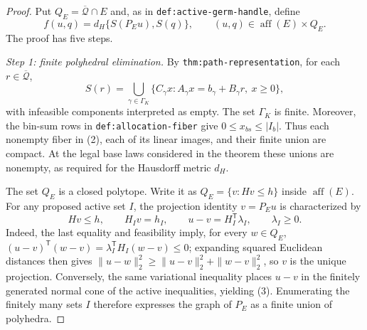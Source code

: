 \documentclass{article}
\begin{document}
\begin{proof}
Put \(Q_E=\overline{\mathcal Q}\cap E\) and, as in \texttt{def:active-germ-handle}, define
\[
 f(u,q)=d_H\{S(P_Eu),S(q)\},
 \qquad (u,q)\in\operatorname{aff}(E)\times Q_E.
\tag{1}
\]
The proof has five steps.

\emph{Step 1: finite polyhedral elimination.}
By \texttt{thm:path-representation}, for each \(r\in\overline{\mathcal Q}\),
\[
 S(r)=\bigcup_{\gamma\in\Gamma_K}
 \{C_\gamma x:A_\gamma x=b_\gamma+B_\gamma r,\ x\geq0\},
\tag{2}
\]
with infeasible components interpreted as empty.  The set \(\Gamma_K\) is finite.  Moreover, the bin-sum rows in \texttt{def:allocation-fiber} give \(0\leq x_{bs}\leq |I_b|\).  Thus each nonempty fiber in (2), each of its linear images, and their finite union are compact.  At the legal base laws considered in the theorem these unions are nonempty, as required for the Hausdorff metric \(d_H\).

The set \(Q_E\) is a closed polytope.  Write it as \(Q_E=\{v:Hv\leq h\}\) inside \(\operatorname{aff}(E)\).  For any proposed active set \(I\), the projection identity \(v=P_Eu\) is characterized by
\[
 Hv\leq h,\qquad H_Iv=h_I,\qquad
 u-v=H_I^{\mathsf T}\lambda_I,\qquad \lambda_I\geq0.
\tag{3}
\]
Indeed, the last equality and feasibility imply, for every \(w\in Q_E\),
\((u-v)^{\mathsf T}(w-v)=\lambda_I^{\mathsf T}H_I(w-v)\leq0\); expanding squared Euclidean distances then gives \(\|u-w\|_2^2\geq\|u-v\|_2^2+\|w-v\|_2^2\), so \(v\) is the unique projection.  Conversely, the same variational inequality places \(u-v\) in the finitely generated normal cone of the active inequalities, yielding (3).  Enumerating the finitely many sets \(I\) therefore expresses the graph of \(P_E\) as a finite union of polyhedra.


\end{proof}
\end{document}
